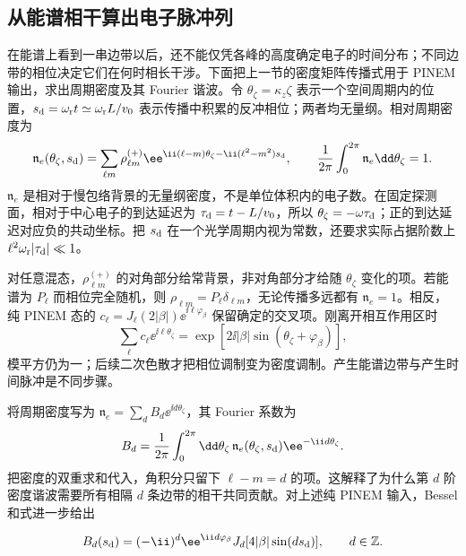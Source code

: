 \subsection{从能谱相干算出电子脉冲列}
\label{sec:electron-temporal-bunching-worked}

在能谱上看到一串边带以后，还不能仅凭各峰的高度确定电子的时间分布；不同边带的相位决定它们在何时相长干涉。下面把上一节的密度矩阵传播式用于 PINEM 输出，求出周期密度及其 Fourier 谐波。令 $\theta_\zeta=\kappa_z\zeta$ 表示一个空间周期内的位置，$s_{\rm d}=\omega_{\rm r}t\simeq\omega_{\rm r}L/v_0$ 表示传播中积累的反冲相位；两者均无量纲。相对周期密度为
\begin{equation}
 \mathfrak n_e(\theta_\zeta,s_{\rm d})
 =\sum_{\ell m}\rho_{\ell m}^{(+)}
 \ee^{\ii(\ell-m)\theta_\zeta-\ii(\ell^2-m^2)s_{\rm d}},\qquad
 \frac1{2\pi}\int_0^{2\pi}\mathfrak n_e\dd\theta_\zeta=1.
 \label{eq:electron-bunching-normalized-density}
\end{equation}
$\mathfrak n_e$ 是相对于慢包络背景的无量纲密度，不是单位体积内的电子数。在固定探测面，相对于中心电子的到达延迟为 $\tau_{\rm d}=t-L/v_0$，所以 $\theta_\zeta=-\omega\tau_{\rm d}$；正的到达延迟对应负的共动坐标。把 $s_{\rm d}$ 在一个光学周期内视为常数，还要求实际占据阶数上 $\ell^2\omega_{\rm r}|\tau_{\rm d}|\ll1$。

对任意混态，$\rho_{\ell m}^{(+)}$ 的对角部分给常背景，非对角部分才给随 $\theta_\zeta$ 变化的项。若能谱为 $P_\ell$ 而相位完全随机，则 $\rho_{\ell m}=P_\ell\delta_{\ell m}$，无论传播多远都有 $\mathfrak n_e=1$。相反，纯 PINEM 态的 $c_\ell=J_\ell(2|\beta|)\ee^{\ii\ell\varphi_\beta}$ 保留确定的交叉项。刚离开相互作用区时
\begin{equation*}
 \sum_\ell c_\ell\ee^{\ii\ell\theta_\zeta}
 =\exp[2\ii|\beta|\sin(\theta_\zeta+\varphi_\beta)],
\end{equation*}
模平方仍为一；后续二次色散才把相位调制变为密度调制。产生能谱边带与产生时间脉冲是不同步骤。

将周期密度写为 $\mathfrak n_e=\sum_d B_d\ee^{\ii d\theta_\zeta}$，其 Fourier 系数为
\[
B_d=\frac1{2\pi}\int_0^{2\pi}\dd\theta_\zeta\,
\mathfrak n_e(\theta_\zeta,s_{\rm d})\ee^{-\ii d\theta_\zeta}.
\]
把密度的双重求和代入，角积分只留下 $\ell-m=d$ 的项。这解释了为什么第 $d$ 阶密度谐波需要所有相隔 $d$ 条边带的相干共同贡献。对上述纯 PINEM 输入，Bessel 和式进一步给出
\begin{proposition}
\begin{equation}
 B_d(s_{\rm d})=(-\ii)^d\ee^{\ii d\varphi_\beta}
 J_d[4|\beta|\sin(ds_{\rm d})],\qquad d\in\mathbb Z.
 \label{eq:electron-pinem-bunching-closed}\end{equation}
\end{proposition}

